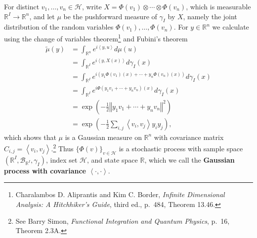 \documentclass{article}
\newcommand{\inner}[2]{\left\langle #1, #2 \right\rangle}
\newcommand{\norm}[1]{\left\Vert #1 \right\Vert}
\theoremstyle{definition}
\begin{document}
For distinct $v_1,\ldots,v_n \in \mathscr{H}$, write $X=\Phi(v_1) \otimes \cdots \otimes \Phi(v_n)$, which is measurable
$\mathbb{R}^I \to \mathbb{R}^n$, and let $\mu$ be the pushforward measure of $\gamma_I$ by $X$, namely the joint distribution
of the random variables $\Phi(v_1),\ldots,\Phi(v_n)$. 
For $y \in \mathbb{R}^n$ we calculate
using the change of variables theorem\footnote{Charalambos D. Aliprantis
and Kim C. Border, {\em Infinite Dimensional Analysis: A Hitchhiker's Guide}, third ed., p.~484, Theorem 13.46.}
and Fubini's theorem
\begin{align*}
\widetilde{\mu}(y)&=\int_{\mathbb{R}^n} e^{i\inner{y}{u}} d\mu(u)\\
&=\int_{\mathbb{R}^I} e^{i\inner{y}{X(x)}} d\gamma_I(x)\\
&=\int_{\mathbb{R}^I} e^{i(y_1\Phi(v_1)(x)+\cdots+y_n\Phi(v_n)(x))} d\gamma_I(x)\\
&=\int_{\mathbb{R}^I} e^{i\Phi(y_1v_1+\cdots+y_nv_n)(x)} d\gamma_I(x)\\
&= \exp\left(-\frac{1}{2} \norm{y_1v_1+\cdots+y_nv_n}^2 \right)\\
&=\exp\left(-\frac{1}{2} \sum_{i,j}  \inner{v_i}{v_j} y_i y_j \right),
\end{align*}
which shows that $\mu$ is a Gaussian measure on $\mathbb{R}^n$ with covariance matrix 
$C_{i,j}=\inner{v_i}{v_j}$.\footnote{See Barry Simon, {\em Functional Integration and Quantum Physics}, p.~16, Theorem 2.3A.}
Thus $\{\Phi(v)\}_{v \in \mathscr{H}}$ is a stochastic process with sample space $(\mathbb{R}^I,\mathscr{B}_{\mathbb{R}^I},\gamma_I)$,
index set $\mathscr{H}$, and
state space $\mathbb{R}$, which we call the \textbf{Gaussian process with covariance $\inner{\cdot}{\cdot}$}.
\end{document}
